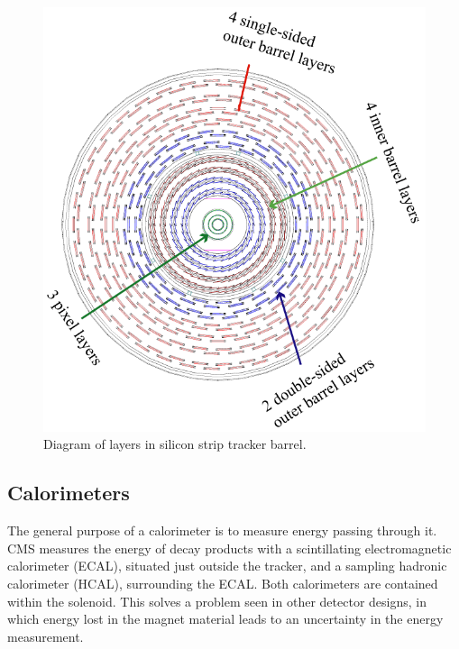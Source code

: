 \begin{figure}[htb]
  \begin{center}
    \includegraphics[width=360pt]{Figures/tracker-Barrel.png}
  \end{center}
  \caption[Diagram of layers in silicon strip tracker barrel]{Diagram of layers in silicon strip tracker barrel.}
  \label{fig:TrackerBarrel}
 \end{figure}

\subsection{Calorimeters}
The general purpose of a calorimeter 
is to measure energy passing through it.  
CMS measures the energy of decay products 
with a scintillating electromagnetic calorimeter (ECAL),
situated just outside the tracker,
and a sampling hadronic calorimeter (HCAL),
surrounding the ECAL.  
Both calorimeters are contained within the solenoid.  
This solves a problem seen in other detector designs, 
in which energy lost in the magnet material leads 
to an uncertainty in the energy measurement.  

